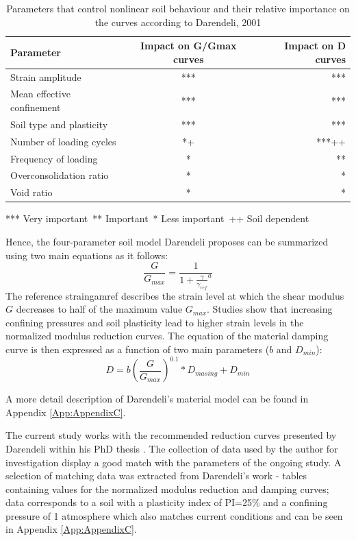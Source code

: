 \documentclass[11pt,a4paper]{report}
\begin{document}
\begin{table}[h!]
\centering
\begin{tabular}{|l|c|r|}
	\hline Parameter       &      Impact on G/Gmax curves   &  Impact on D curves     \\ 
	\hline Strain amplitude    & *** &  ***  \\ 
	\hline Mean effective confinement  & ***  &  ***  \\ 
	\hline Soil type and plasticity &  ***  &  ***    \\ 
	\hline Number of loading cycles &  *+  &  ***++    \\ 
	\hline Frequency of loading &  *  &    **    \\ 
	\hline Overconsolidation ratio &  *  &    *    \\ 
	\hline Void ratio  &   *   &    *    \\ 
	\hline
\end{tabular}

*** Very important\
** Important\
* Less important\
++ Soil dependent\
\caption{Parameters that control nonlinear soil behaviour and their relative importance on the curves according to Darendeli, 2001 \cite{darendeli2001development}}
\label{Darendeli_param}
\end{table}

Hence, the four-parameter soil model Darendeli proposes can be summarized using two main equations as it follows:
\begin{equation}
	\frac{G}{G_{max}}=\frac{1}{1+{\frac{\gamma}{\gamma_{ref}}}^a}
\end{equation}
The reference strain\gls{gamref} describes the strain level at which the shear modulus $G$ decreases to half of the maximum value $G_{max}$. Studies show that increasing confining pressures and soil plasticity lead to higher strain levels in the normalized modulus reduction curves.
The equation of the material damping curve is then expressed as a function of two main parameters ($b$ and $D_{min}$):
\begin{equation}
	D=b(\frac{G}{G_{max}})^{0.1}*D_{masing}+D_{min}
\end{equation}

A more detail description of Darendeli's material model can be found in Appendix \ref{App:AppendixC}.

The current study works with the recommended reduction curves presented by Darendeli within his PhD thesis \cite{darendeli2001development}. The collection of data used by the author for investigation display a good match with the parameters of the ongoing study. A selection of matching data was extracted from Darendeli's work - tables containing values for the normalized modulus reduction and damping curves; data corresponds to a soil with a plasticity index of PI=25\% and a confining pressure of 1 atmosphere which also matches current conditions and can be seen in Appendix \ref{App:AppendixC}.
\end{document}
